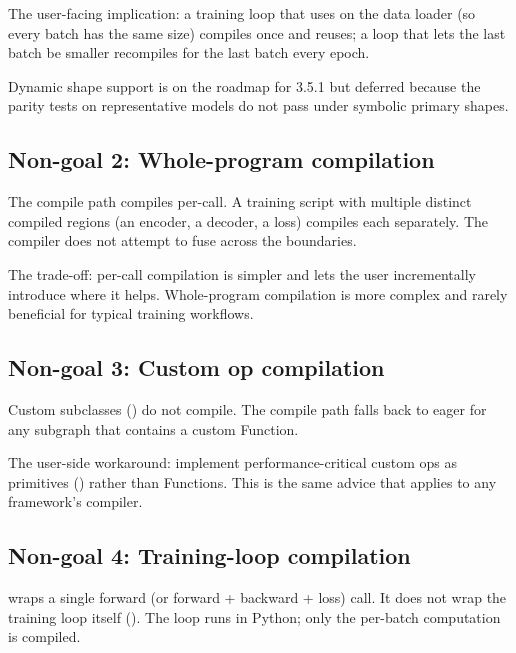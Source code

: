 The user-facing implication: a training loop that uses
 on the data loader (so every batch has
the same size) compiles once and reuses; a loop that lets the
last batch be smaller recompiles for the last batch every epoch.

Dynamic shape support is on the roadmap for 3.5.1 but deferred
because the parity tests on representative models do not pass
under symbolic primary shapes.

\subsection{Non-goal 2: Whole-program compilation}
\label{ssec:compile_design:non_goal_whole_program}

The compile path compiles per-call. A training script with
multiple distinct compiled regions (an encoder, a decoder, a
loss) compiles each separately. The compiler does not attempt to
fuse across the boundaries.

The trade-off: per-call compilation is simpler and lets the user
incrementally introduce  where it helps.
Whole-program compilation is more complex and rarely beneficial
for typical training workflows.

\subsection{Non-goal 3: Custom op compilation}
\label{ssec:compile_design:non_goal_custom_ops}

Custom  subclasses ()
do not compile. The compile path falls back to eager for any
subgraph that contains a custom Function.

The user-side workaround: implement performance-critical custom
ops as primitives () rather than Functions.
This is the same advice that applies to any framework's compiler.

\subsection{Non-goal 4: Training-loop compilation}
\label{ssec:compile_design:non_goal_loop}

 wraps a single forward (or forward + backward
+ loss) call. It does not wrap the training loop itself
(). The loop runs in Python; only
the per-batch computation is compiled.

